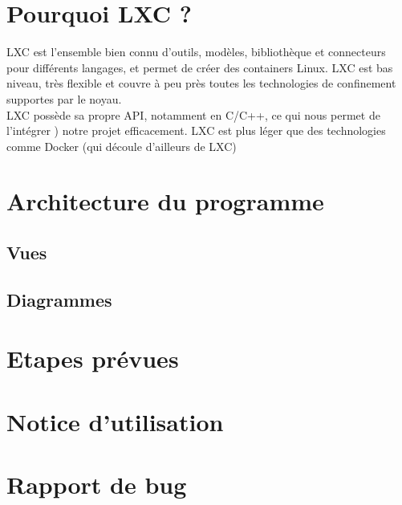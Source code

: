 \documentclass[a4paper]{article}
\begin{document}
\section{Pourquoi LXC ?}
LXC est l'ensemble bien connu d'outils, modèles, bibliothèque et connecteurs pour diff\'erents langages, et permet de cr\'eer des containers Linux. LXC est bas niveau, très flexible et couvre à peu près toutes les technologies de confinement supportes par le noyau.\\LXC possède sa propre API, notamment en C/C++, ce qui nous permet de l'int\'egrer ) notre projet efficacement. LXC est plus l\'eger que des technologies comme Docker (qui d\'ecoule d'ailleurs de LXC)

\section{Architecture du programme}
\subsection{Vues}

\subsection{Diagrammes}


\section{Etapes pr\'evues}



\section{Notice d'utilisation}


\section{Rapport de bug}

\end{document}
